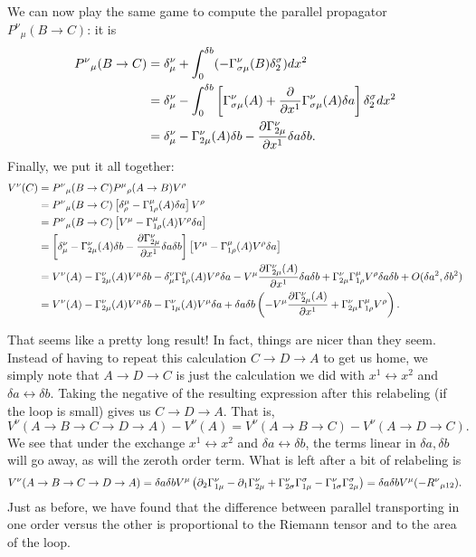 We can now play the same game to compute the parallel propagator ${P^\nu}_\mu(B\to C)$: it is
\begin{align*}
{P^\nu}_\mu(B\to C)&=\delta^\nu_\mu +\int_0^{\delta b} (-\Gamma^\nu_{\sigma \mu}(B)\delta^\sigma_2) dx^2\\
&=\delta^\nu_\mu -\int_0^{\delta b}\left[\Gamma^\nu_{\sigma \mu}(A)+\frac{\partial}{\partial x^1}\Gamma^\nu_{\sigma\mu}(A)\delta a\right]\delta^\sigma_2 dx^2\\
&=\delta^\nu_\mu-\Gamma^\nu_{2 \mu}(A) \delta b - \frac{\partial\Gamma^\nu_{2\mu}}{\partial x^1}\delta a \delta b.
\end{align*}
Finally, we put it all together:
\begin{align*}
V^\nu(C)&= {P^\nu}_\mu(B\to C){P^\mu}_\rho(A\to B) V^\rho\\
&={P^\nu}_\mu(B\to C) \left[\delta^\mu_\rho -\Gamma^\mu_{1\rho}(A) \delta a\right] V^\rho\\
&={P^\nu}_\mu(B\to C)\left[ V^\mu-\Gamma^\mu_{1\rho}(A) V^\rho \delta a\right]\\
&=\left[\delta^\nu_\mu-\Gamma^\nu_{2 \mu}(A) \delta b - \frac{\partial\Gamma^\nu_{2\mu}}{\partial x^1}\delta a \delta b\right]\left[ V^\mu-\Gamma^\mu_{1\rho}(A) V^\rho \delta a\right]\\
&=V^\nu(A)-\Gamma^\nu_{2\mu}(A)V^\mu \delta b - \delta^\nu_\mu\Gamma^\mu_{1\rho}(A) V^\rho \delta a - V^\mu \frac{\partial \Gamma^\nu_{2\mu}(A)}{\partial x^1}\delta a \delta b +\Gamma^\nu_{2\mu} \Gamma^\mu_{1\rho}V^\rho \delta a \delta b+O(\delta a^2,\delta b^2)\\
&=V^\nu(A)-\Gamma^\nu_{2\mu}(A)V^\mu \delta b - \Gamma^\nu_{1\mu}(A) V^\mu \delta a + \delta a \delta b \left(-V^\mu \frac{\partial \Gamma^\nu_{2\mu}(A)}{\partial x^1} +\Gamma^\nu_{2\mu} \Gamma^\mu_{1\rho}V^\rho \right).
\end{align*}

That seems like a pretty long result! In fact, things are nicer than they seem. Instead of having to repeat this calculation $C\to D \to A$ to get us home, we simply note that $A\to D \to C$ is just the calculation we did with $x^1\leftrightarrow x^2$ and $\delta a \leftrightarrow \delta b$. Taking the negative of the resulting expression after this relabeling (if the loop is small) gives us $C\to D \to A$. That is, 
$$V^\nu(A\to B \to C \to D \to A)-V^\nu (A)=V^\nu(A\to B \to C)-V^\nu(A \to D \to C).$$
We see that under the exchange $x^1\leftrightarrow x^2$ and $\delta a \leftrightarrow \delta b$, the terms linear in $\delta a, \delta b$ will go away, as will the zeroth order term. What is left after a bit of relabeling is
$$V^\nu(A\to B \to C \to D \to A)=\delta a \delta b
V^\mu \left(\partial_2 \Gamma^\nu_{1\mu} -\partial_1 \Gamma^\nu_{2 \mu} +\Gamma^\nu_{2\sigma} \Gamma^\sigma_{1\mu} - \Gamma^\nu_{1\sigma} \Gamma^\sigma_{2\mu}\right)=\delta a \delta b V^\mu (-{R^\nu}_{\mu 12}).$$
Just as before, we have found that the difference between parallel transporting in one order versus the other is proportional to the Riemann tensor and to the area of the loop.